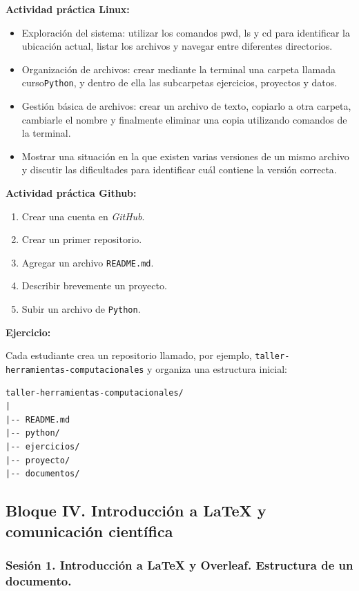 \documentclass[12pt,letterpaper]{article}
\newcommand{\python}{\texttt{Python}}
\newcommand{\github}{\textit{GitHub}}
\begin{document}
\textbf{Actividad práctica Linux:}
\begin{itemize}
\item Exploración del sistema: utilizar los comandos pwd, ls y cd para identificar la ubicación actual, listar los archivos y navegar entre diferentes directorios.
\item Organización de archivos: crear mediante la terminal una carpeta llamada curso\python, y dentro de ella las subcarpetas ejercicios, proyectos y datos.
\item Gestión básica de archivos: crear un archivo de texto, copiarlo a otra carpeta, cambiarle el nombre y finalmente eliminar una copia utilizando comandos de la terminal.
\item Mostrar una situación en la que existen varias versiones de un mismo archivo y discutir las dificultades para identificar cuál contiene la
versión correcta.
\end{itemize}

\textbf{Actividad práctica Github:}
\begin{enumerate}[noitemsep]
    \item Crear una cuenta en \github.
    \item Crear un primer repositorio.
    \item Agregar un archivo \texttt{README.md}.
    \item Describir brevemente un proyecto.
    \item Subir un archivo de \python.
\end{enumerate}

\textbf{Ejercicio:}

Cada estudiante crea un repositorio llamado, por ejemplo, \texttt{taller-herramientas-computacionales} y organiza una estructura
inicial:

\begin{verbatim}
taller-herramientas-computacionales/
|
|-- README.md
|-- python/
|-- ejercicios/
|-- proyecto/
|-- documentos/
\end{verbatim}

\subsection{Bloque IV. Introducción a LaTeX y comunicación científica}

\subsubsection*{Sesión 1. Introducción a LaTeX y Overleaf. Estructura de un documento.}
\end{document}
